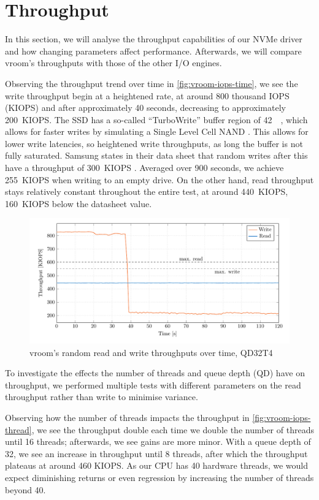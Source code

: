 \section{Throughput}
In this section, we will analyse the throughput capabilities of our NVMe driver and how changing parameters affect performance. Afterwards, we will compare vroom's throughputs with those of the other I/O engines.

Observing the throughput trend over time in \autoref{fig:vroom-iops-time}, we see the write throughput begin at a heightened rate, at around 800 thousand IOPS (KIOPS) and after approximately 40 seconds, decreasing to approximately \qty{200}{KIOPS}. The SSD has a so-called ``TurboWrite'' buffer region of \qty{42}{\giga\byte}, which allows for faster writes by simulating a Single Level Cell NAND \cite{turbowrite}. This allows for lower write latencies, so heightened write throughputs, as long the buffer is not fully saturated. Samsung states in their data sheet that random writes after this have a throughput of \qty{300}{KIOPS} \cite{ssd-datasheet}. Averaged over 900 seconds, we achieve \qty{255}{KIOPS} when writing to an empty drive. On the other hand, read throughput stays relatively constant throughout the entire test, at around \qty{440}{KIOPS}, \qty{160}{KIOPS} below the datasheet value.

\begin{figure}[H]
  \centering
    \includegraphics[width=\textwidth]{figures/vroom-iops-time}
    \caption{vroom's random read and write throughputs over time, QD32T4}
    \label{fig:vroom-iops-time}
\end{figure}

To investigate the effects the number of threads and queue depth (QD) have on throughput, we performed multiple tests with different parameters on the read throughput rather than write to minimise variance.

Observing how the number of threads impacts the throughput in \autoref{fig:vroom-iops-thread}, we see the throughput double each time we double the number of threads until 16 threads; afterwards, we see gains are more minor. With a queue depth of 32, we see an increase in throughput until 8 threads, after which the throughput plateaus at around 460 KIOPS. As our CPU has 40 hardware threads, we would expect diminishing returns or even regression by increasing the number of threads beyond 40.

